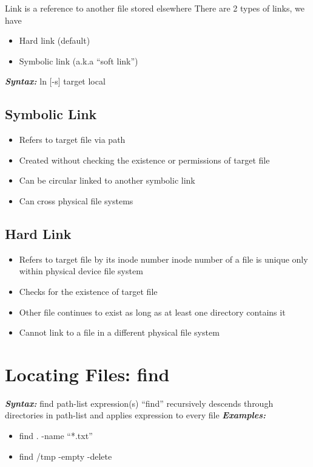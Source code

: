 \documentclass{report}
\begin{document}
\noindent  Link is a reference to another file stored elsewhere 
\bigbreak \noindent
There are 2 types of links, we have
\begin{itemize}
  \item Hard link (default) 
  \item Symbolic link (a.k.a ``soft link'')
\end{itemize}
\textit{\textbf{Syntax:}} ln [-s] target local
\newpage
\subsection{Symbolic Link}
\begin{itemize}
  \item Refers to target file via path 
  \item Created without checking the existence or permissions of target file
  \item Can be circular linked to another symbolic link
  \item Can cross physical file systems
\end{itemize}
\subsection{Hard Link}
\begin{itemize}
  \item Refers to target file by its inode number 
  \subitem inode number of a file is unique only
  \subitem within physical device file system
  \item Checks for the existence of target file
  \item Other file continues to exist as long as at least one directory contains it
  \item Cannot link to a file in a different physical file system
\end{itemize}
\section{Locating Files: find}
\textit{\textbf{Syntax:}} find path-list expression(s)
\bigbreak \noindent
``find'' recursively descends through directories in path-list and applies expression to every file
\bigbreak \noindent
\textit{\textbf{Examples:}}
\begin{itemize}
  \item find . -name ``*.txt'' 
  \item find /tmp -empty -delete
\end{itemize}
\end{document}
